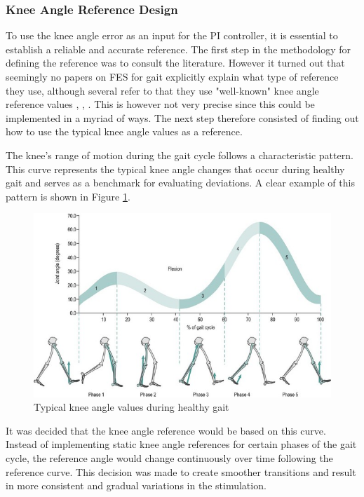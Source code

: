 \subsubsection{Knee Angle Reference Design}
To use the knee angle error as an input for the PI controller, it is essential to establish a reliable and accurate reference. The first step in the methodology for defining the reference was to consult the literature. However it turned out that seemingly no papers on FES for gait explicitly explain what type of reference they use, although several refer to that they use "well-known" knee angle reference values \cite{bouri_closed-loop_2018}, \cite{ferrante_personalized_2016}, \cite{muller_adaptive_2020}. This is however not very precise since this could be implemented in a myriad of ways. The next step therefore consisted of finding out how to use the typical knee angle values as a reference.

The knee’s range of motion during the gait cycle follows a characteristic pattern. This curve represents the typical knee angle changes that occur during healthy gait and serves as a benchmark for evaluating deviations. A clear example of this pattern is shown in Figure \ref{fig:kneecurvetypical}.

\begin{figure} [h]
    \centering
    \includegraphics[width=0.99\linewidth]{images/B9780702043444000158_f015-005-9780702043444.jpg}
    \caption{Typical knee angle values during healthy gait \cite{themes_biomechanics_2017}}
    \label{fig:kneecurvetypical}
\end{figure}
It was decided that the knee angle reference would be based on this curve. Instead of implementing static knee angle references for certain phases of the gait cycle, the reference angle would change continuously over time following the reference curve. This decision was made to create smoother transitions and result in more consistent and gradual variations in the stimulation.

